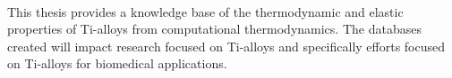 \paragraph*{} This thesis provides a knowledge base of the thermodynamic and elastic properties of Ti-alloys from computational thermodynamics. The databases created will impact research focused on Ti-alloys and specifically efforts focused on Ti-alloys for biomedical applications.




